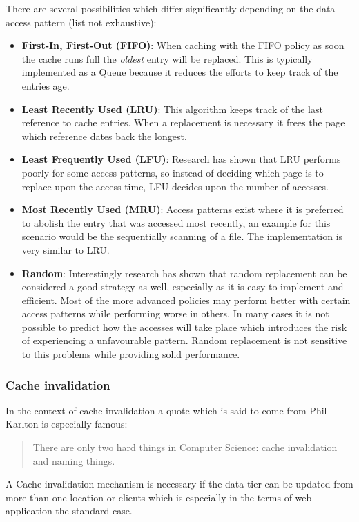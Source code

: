 There are several possibilities which differ significantly depending on the data access pattern (list not exhaustive):
\begin{itemize}
	\item \textbf{First-In, First-Out (FIFO)}: When caching with the FIFO policy as soon the cache runs full the \emph{oldest} entry will be replaced. This is typically implemented as a Queue because it reduces the efforts to keep track of the entries age.
	\item \textbf{Least Recently Used (LRU)}: This algorithm keeps track of the last reference to cache entries. When a replacement is necessary it frees the page which reference dates back the longest. 
	\item \textbf{Least Frequently Used (LFU)}: Research has shown that LRU performs poorly for some access patterns, so instead of deciding which page is to replace upon the access time, LFU decides upon the number of accesses.
	\item \textbf{Most Recently Used (MRU)}: Access patterns exist where it is preferred to abolish the entry that was accessed most recently, an example for this scenario would be the sequentially scanning of a file. The implementation is very similar to LRU.
	\item \textbf{Random}: Interestingly research has shown that random replacement can be considered a good strategy as well, especially as it is easy to implement and efficient. Most of the more advanced policies may perform better with certain access patterns while performing worse in others. In many cases it is not possible to predict how the accesses will take place which introduces the risk of experiencing a unfavourable pattern. Random replacement is not sensitive to this problems while providing solid performance.
\end{itemize}

\subsubsection{Cache invalidation}
In the context of cache invalidation a quote which is said to come from Phil Karlton is especially famous:
\begin{quote}
There are only two hard things in Computer Science: cache invalidation and naming things.
\end{quote}

A Cache invalidation mechanism is necessary if the data tier can be updated from more than one location or clients which is especially in the terms of web application the standard case. 

